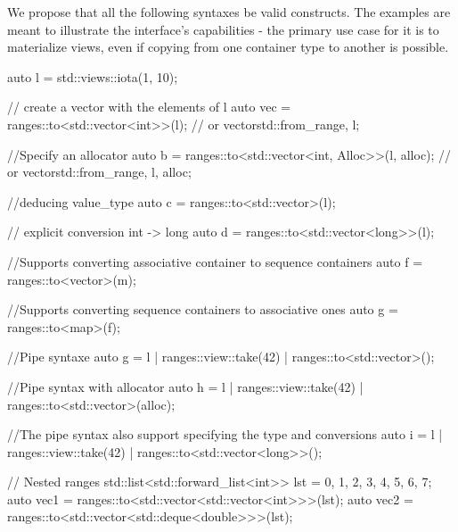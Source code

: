 \documentclass{wg21}
\begin{document}
We propose that all the following syntaxes be valid constructs.
The examples are meant to illustrate the interface's capabilities - the primary use case for it is to materialize views, even if copying from one container type to another is possible.

\begin{colorblock}
auto l = std::views::iota(1, 10);

// create a vector with the elements of l
auto vec = ranges::to<std::vector<int>>(l); // or vector{std::from_range, l};

//Specify an allocator
auto b = ranges::to<std::vector<int, Alloc>>(l, alloc); // or vector{std::from_range, l, alloc};

//deducing value_type
auto c = ranges::to<std::vector>(l);

// explicit conversion int -> long
auto d = ranges::to<std::vector<long>>(l);


//Supports converting associative container to sequence containers
auto f = ranges::to<vector>(m);

//Supports converting sequence containers to associative ones
auto g = ranges::to<map>(f);

//Pipe syntaxe
auto g = l | ranges::view::take(42) | ranges::to<std::vector>();

//Pipe syntax with allocator
auto h = l | ranges::view::take(42) | ranges::to<std::vector>(alloc);

//The pipe syntax also support specifying the type and conversions
auto i = l | ranges::view::take(42) | ranges::to<std::vector<long>>();

// Nested ranges
std::list<std::forward_list<int>> lst = {{0, 1, 2, 3}, {4, 5, 6, 7}};
auto vec1 = ranges::to<std::vector<std::vector<int>>>(lst);
auto vec2 = ranges::to<std::vector<std::deque<double>>>(lst);

\end{colorblock}
\end{document}
